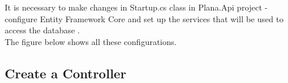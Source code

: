 \documentclass{scrartcl}
\begin{document}
It is necessary to make changes in Startup.cs class in Plana.Api project - configure Entity Framework Core and set up the services that will be used to access the database \cite{efa}.\\
The figure below shows all these configurations.

\noindent%
\begin{minipage}{\linewidth}%
\end{minipage}


\subsection{Create a Controller}

















\end{document}
